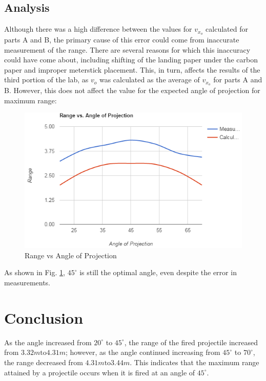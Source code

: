 \documentclass[11pt, titlepage]{article}
\begin{document}
\subsection*{Analysis}
Although there was a high difference between the values for $v_{x_o}$ calculated for parts A and B, the primary cause of this error could come from inaccurate measurement of the range. There are several reasons for which this inaccuracy could have come about, including shifting of the landing paper under the carbon paper and improper meterstick placement. This, in turn, affects the results of the third portion of the lab, as $v_o$ was calculated as the average of $v_{x_o}$ for parts A and B. However, this does not affect the value for the expected angle of projection for maximum range:
\begin{figure}[!ht]
\centering
\includegraphics[scale=.8, angle=0]{lab2_graph.png}
\caption{Range vs Angle of Projection \label{fig:graph}}
\end{figure}

\noindent As shown in Fig. \ref{fig:graph}, $45^\circ$ is still the optimal angle, even despite the error in measurements.

\section*{Conclusion}
As the angle increased from $20^\circ$ to $45^\circ$, the range of the fired projectile increased from $3.32 m \text{to} 4.31 m$; however, as the angle continued increasing from $45^\circ$ to $70^\circ$, the range decreased from $4.31 m \text{to} 3.44 m$. This indicates that the maximum range attained by a projectile occurs when it is fired at an angle of $45^\circ$.
\end{document}
